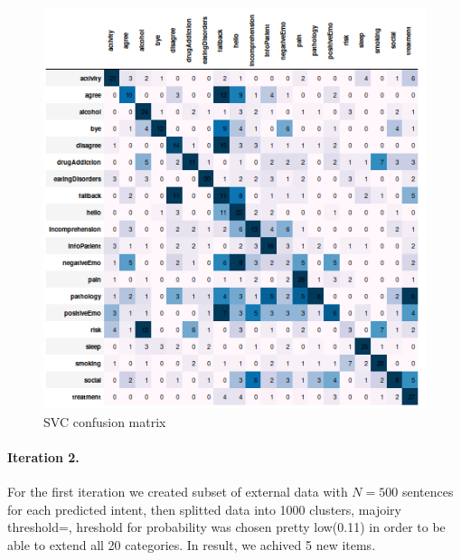 \documentclass[11pt]{article}
\begin{document}
\begin{figure}[h]
	\centering
	\includegraphics[scale=0.40]{svc1_cm.png}
	\caption{SVC confusion matrix}
\label{lda_gm_cm}
\end{figure}
\FloatBarrier

\paragraph{Iteration 2.} For the first iteration we created subset of external data with $N=500$ sentences for each predicted intent, then splitted data into 1000 clusters, majoiry threshold=, hreshold for probability was chosen pretty low(0.11) in order to be able to extend all 20 categories. In result, we achived 5 new items.
\end{document}
